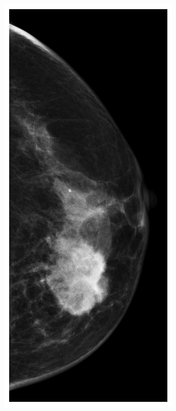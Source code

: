 \documentclass[a4paper,10pt]{book}
\begin{document}
\begin{figure}[h!]
\begin{subfigure}[t]{0.15\textwidth}
\includegraphics[width=\textwidth]{reports//assets/preprocess_b.png}

\end{subfigure}
\end{figure}
\end{document}
